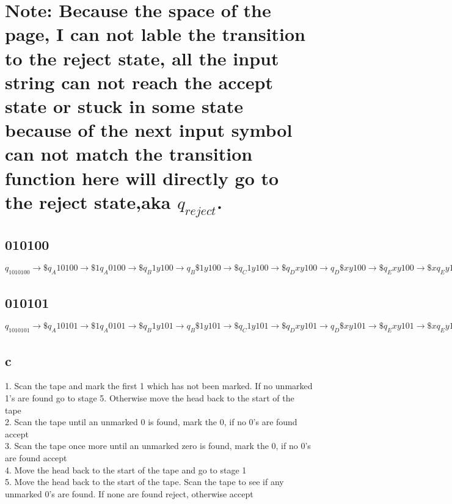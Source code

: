 \documentclass{scrartcl}
\newcommand{\bl}{{\sqcup}}
\begin{document}
\section*{Note: Because the space of the page, I can not lable the transition to the reject state, all the input string can not reach the accept state or stuck in some state because of the next input symbol can not match the transition function here will directly go to the reject state,aka $q_{reject}$.} 
\subsection*{010100}
$q_1010100\to\$q_A10100\to\$1q_A0100\to\$q_B1y100\to q_B\$1y100\to\$q_C1y100 \to\$q_Dxy100\to q_D\$xy100\to\$q_Exy100\to\$xq_Ey100\to\$xyq_E100\to\$xq_Fyx00
\to\$q_Fxyx00\to q_F\$xyx00\to\$q_Gxyx00\to\$xq_Gyx00\to\$xyq_Gx00\to\$xyxq_G00
\to\$xyxyq_H0\to\$xyxq_Iyy\to\$xyq_Ixyy\to\$xq_Iyxyy\to\$q_Ixyxyy\to q_I\$xyxyy
\to\$q_Exyxyy\to\$xq_Eyxyy\to\$xyq_Exyy\to\$xyxq_Eyy\to\$xyxyq_Ey\to\$xyxyyq_E\bl
\to\$xyxyq_Jy\bl\to\$xyxq_Jyy\bl\to\$xyq_Jxyy\bl\to\$xq_Jyxyy\bl\to\$q_Jxyxyy\bl
\to q_J\$xyxyy\bl\to\$ q_Kxyxyy\bl\to\$xq_Kyxyy\bl\to\$xyq_Kxyy\bl\to\$xyxq_Kyy\bl
\to\$xyxyq_Ky\bl\to\$xyxyyq_K\bl\to\$xyxyy\bl q_{accept}$

\subsection*{010101}
$q_1010101\to\$q_A10101\to\$1q_A0101\to\$q_B1y101\to q_B\$1y101\to\$q_C1y101 \to\$q_Dxy101\to q_D\$xy101\to\$q_Exy101\to\$xq_Ey101\to\$xyq_E101\to\$xq_Fyx01
\to\$q_Fxyx01\to q_F\$xyx01\to\$q_Gxyx01\to\$xq_Gyx01\to\$xyq_Gx01\to\$xyxq_G01
\to\$xyxyq_H1\to\$xyxy1q_H\bl\to\$xyxy1q_{reject}\bl$
\subsection*{c}
1. Scan the tape and mark the first 1 which has not been marked. If no unmarked 1’s are
found go to stage 5. Otherwise move the head back to the start of the tape\\
2. Scan the tape until an unmarked 0 is found, mark the 0, if no 0’s are found accept\\
3. Scan the tape once more until an unmarked zero is found, mark the 0, if no 0’s are found
accept\\
4. Move the head back to the start of the tape and go to stage 1\\
5. Move the head back to the start of the tape. Scan the tape to see if any unmarked 0’s are
found. If none are found reject, otherwise accept
\end{document}
